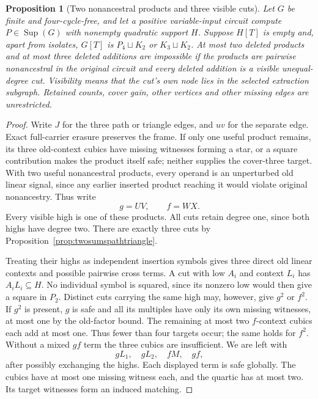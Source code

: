\documentclass[11pt]{article}
\newcommand{\Sup}{\operatorname{Sup}}
\newtheorem{proposition}[theorem]{Proposition}
\theoremstyle{definition}
\theoremstyle{remark}
\begin{document}
\begin{proposition}[Two nonancestral products and three visible cuts]\label{prop:twooldthreecuts}
Let $G$ be finite and four-cycle-free, and let a positive variable-input circuit compute $P\in\Sup(G)$ with nonempty quadratic support $H$. Suppose $H[T]$ is empty and, apart from isolates, $G[T]$ is $P_4\sqcup K_2$ or $K_3\sqcup K_2$. At most two deleted products and at most three deleted additions are impossible if the products are pairwise nonancestral in the original circuit and every deleted addition is a visible unequal-degree cut. Visibility means that the cut's own node lies in the selected extraction subgraph. Retained counts, cover gain, other vertices and other missing edges are unrestricted.
\end{proposition}
\begin{proof}
Write $J$ for the three path or triangle edges, and $uv$ for the separate edge. Exact full-carrier erasure preserves the frame. If only one useful product remains, its three old-context cubics have missing witnesses forming a star, or a square contribution makes the product itself safe; neither supplies the cover-three target. With two useful nonancestral products, every operand is an unperturbed old linear signal, since any earlier inserted product reaching it would violate original nonancestry. Thus write
\[
 g=UV,\qquad f=WX.
\]
Every visible high is one of these products. All cuts retain degree one, since both highs have degree two. There are exactly three cuts by Proposition~\ref{prop:twosumspathtriangle}.

Treating their highs as independent insertion symbols gives three direct old linear contexts and possible pairwise cross terms. A cut with low $A_i$ and context $L_i$ has $A_iL_i\subseteq H$. No individual symbol is squared, since its nonzero low would then give a square in $P_2$. Distinct cuts carrying the same high may, however, give $g^2$ or $f^2$. If $g^2$ is present, $g$ is safe and all its multiples have only its own missing witnesses, at most one by the old-factor bound. The remaining at most two $f$-context cubics each add at most one. Thus fewer than four targets occur; the same holds for $f^2$. Without a mixed $gf$ term the three cubics are insufficient. We are left with
\[
 gL_1,\quad gL_2,\quad fM,\quad gf,
\]
after possibly exchanging the highs. Each displayed term is safe globally. The cubics have at most one missing witness each, and the quartic has at most two. Its target witnesses form an induced matching.


\end{proof}
\end{document}
